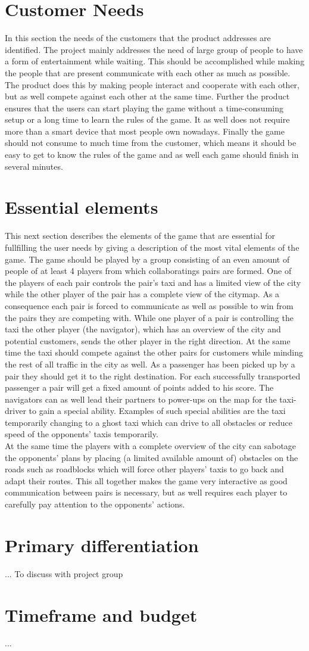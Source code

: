 \documentclass[11pt]{article}
\begin{document}
\section{Customer Needs}
In this section the needs of the customers that the product addresses are identified. The project mainly addresses the need of large group of people to have a form of entertainment while waiting. This should be accomplished while making the people that are present communicate with each other as much as possible. The product does this by making people interact and cooperate with each other, but as well compete against each other at the same time. Further the product ensures that the users can start playing the game without a time-consuming setup or a long time to learn the rules of the game. It as well does not require more than a smart device that most people own nowadays. Finally the game should not consume to much time from the customer, which means it should be easy to get to know the rules of the game and as well each game should finish in several minutes.

\section{Essential elements}
This next section describes the elements of the game that are essential for fullfilling the user needs by giving a description of the most vital elements of the game. The game should be played by a group consisting of an even amount of people of at least 4 players from which collaboratings pairs are formed. One of the players of each pair controls the pair's taxi and has a limited view of the city while the other player of the pair has a complete view of the citymap. As a consequence each pair is forced to communicate as well as possible to win from the pairs they are competing with. While one player of a pair is controlling the taxi the other player (the navigator), which has an overview of the city and potential customers, sends the other player in the right direction. At the same time the taxi should compete against the other pairs for customers while minding the rest of all traffic in the city as well. As a passenger has been picked up by a pair they should get it to the right destination. For each successfully transported passenger a pair will get a fixed amount of points added to his score. The navigators can as well lead their partners to power-ups on the map for the taxi-driver to gain a special ability. Examples of such special abilities are the taxi temporarily changing to a ghost taxi which can drive to all obstacles or reduce speed of the opponents' taxis temporarily.\\
At the same time the players with a complete overview of the city can sabotage the opponents' plans by placing (a limited available amount of) obstacles on the roads such as roadblocks which will force other players' taxis to go back and adapt their routes. This all together makes the game very interactive as good communication between pairs is necessary, but as well requires each player to carefully pay attention to the opponents' actions.

\section{Primary differentiation}
... To discuss with project group

\section{Timeframe and budget}
...
\end{document}
